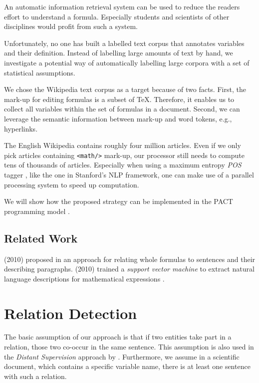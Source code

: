\documentclass[runningheads]{llncs}
\begin{document}
An automatic information retrieval system can be used to reduce the readers effort to understand a formula. Especially students and scientists of other disciplines would profit from such a system.

Unfortunately, no one has built a labelled text corpus that annotates variables and their definition. Instead of labelling large amounts of text by hand, we investigate a potential way of automatically labelling large corpora with a set of statistical assumptions.

We chose the Wikipedia text corpus as a target because of two facts. First, the mark-up for editing formulas is a subset of \TeX. Therefore, it enables us to collect all variables within the set of formulas in a document. Second, we can leverage the semantic information between mark-up and word tokens, e.g., hyperlinks.

The English Wikipedia contains roughly four million articles. Even if we only pick articles containing \texttt{<math/>} mark-up, our processor still needs to compute tens of thousands of articles. Especially when using a maximum entropy \emph{POS} tagger \cite{Rathna96}, like the one in Stanford's NLP framework, one can make use of a parallel processing system to speed up computation.

We will show how the proposed strategy can be implemented in the PACT programming model \cite{Alexandrov2010}.


\subsection{Related Work}
\citeauthor{Quoc2010} (2010) proposed in \cite{Quoc2010} an approach for relating whole formulas to sentences and their describing paragraphs. \citeauthor{Yokoi} (2010) trained a \emph{support vector machine} to extract natural language descriptions for mathematical expressions \cite{Yokoi}.


\section{Relation Detection}
The basic assumption of our approach is that if two entities take part in a relation, those two co-occur in the same sentence. This assumption is also used in the \emph{Distant Supervision} \cite{Mintz2008} approach by \citeauthor{Mintz2008}. Furthermore, we assume in a scientific document, which contains a specific variable name, there is at least one sentence with such a relation.
\end{document}
